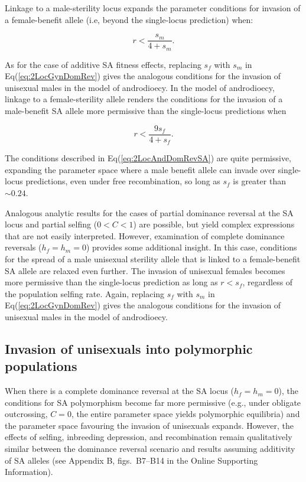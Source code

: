 \documentclass{article}
\begin{document}
Linkage to a male-sterility locus expands the parameter conditions for invasion of a female-benefit allele (i.e, beyond the single-locus prediction) when:

\begin{equation}\label{eq:2LocGynDomRevSA}
    r < \frac{s_m}{4 + s_m}.
\end{equation}

As for the case of additive SA fitness effects, replacing $s_f$ with $s_m$ in Eq(\ref{eq:2LocGynDomRev}) gives the analogous conditions for the invasion of unisexual males in the model of androdioecy. In the model of androdioecy, linkage to a female-sterility allele renders the conditions for the invasion of a male-benefit SA allele more permissive than the single-locus predictions when 

\begin{equation}\label{eq:2LocAndDomRevSA}
    r < \frac{9 s_f}{4 + s_f}.
\end{equation}

\noindent The conditions described in Eq(\ref{eq:2LocAndDomRevSA}) are quite permissive, expanding the parameter space where a male benefit allele can invade over single-locus predictions, even under free recombination, so long as $s_f$ is greater than $\sim 0.24$. 

Analogous analytic results for the cases of partial dominance reversal at the SA locus and partial selfing ($0 < C < 1$) are possible, but yield complex expressions that are not easily interpreted. However, examination of complete dominance reversals ($h_f = h_m = 0$) provides some additional insight. In this case, conditions for the spread of a male unisexual sterility allele that is linked to a female-benefit SA allele are relaxed even further. The invasion of unisexual females becomes more permissive than the single-locus prediction as long as $r < s_f$, regardless of the population selfing rate. Again, replacing $s_f$ with $s_m$ in Eq(\ref{eq:2LocGynDomRev}) gives the analogous conditions for the invasion of unisexual males in the model of androdioecy.


\subsection*{Invasion of unisexuals into polymorphic populations}
When there is a complete dominance reversal at the SA locus ($h_f = h_m = 0$), the conditions for SA polymorphism become far more permissive (e.g., under obligate outcrossing, $C = 0$, the entire parameter space yields polymorphic equilibria) and the parameter space favouring the invasion of unisexuals expands. However, the effects of selfing, inbreeding depression, and recombination remain qualitatively similar between the dominance reversal scenario and results assuming additivity of SA alleles (see Appendix B, figs.~B7--B14 in the Online Supporting Information).
\end{document}
